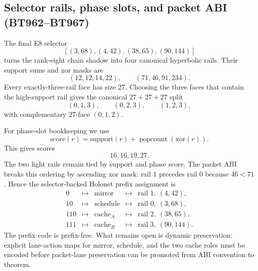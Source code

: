 
\subsection{Selector rails, phase slots, and packet ABI (BT962--BT967)}\label{subsec:bt967-selector-rails}

The final E8 selector
\[
  [(3,68),(4,42),(38,65),(90,144)]
\]
turns the rank-eight chain shadow into four canonical hyperbolic rails.  Their
support sums and xor masks are
\[
  (12,12,14,22),\qquad (71,46,91,234).
\]
Every exactly-three-rail face has size \(27\).  Choosing the three faces that
contain the high-support rail gives the canonical \(27+27+27\) split
\[
  (0,1,3),\qquad (0,2,3),\qquad (1,2,3),
\]
with complementary \(27\)-face \((0,1,2)\).

For phase-slot bookkeeping we use
\[
  \mathrm{score}(r)=\mathrm{support}(r)+\operatorname{popcount}(\mathrm{xor}(r)).
\]
This gives scores
\[
  16,16,19,27.
\]
The two light rails remain tied by support and phase score.  The packet ABI
breaks this ordering by ascending xor mask: rail \(1\) precedes rail \(0\)
because \(46<71\).  Hence the selector-backed Holonet prefix assignment is
\[
\begin{array}{cclcl}
0   &\mapsto& \text{mirror}   &\mapsto& \text{rail }1,\ (4,42),\\
10  &\mapsto& \text{schedule} &\mapsto& \text{rail }0,\ (3,68),\\
110 &\mapsto& \text{cache}_A  &\mapsto& \text{rail }2,\ (38,65),\\
111 &\mapsto& \text{cache}_B  &\mapsto& \text{rail }3,\ (90,144).
\end{array}
\]
The prefix code is prefix-free.  What remains open is dynamic preservation:
explicit lane-action maps for mirror, schedule, and the two cache roles must be
encoded before packet-lane preservation can be promoted from ABI convention to
theorem.
